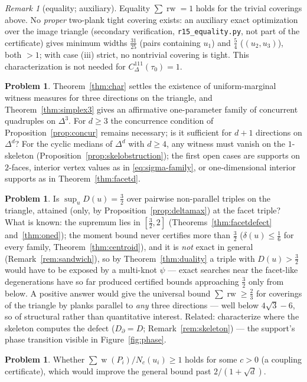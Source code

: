 \documentclass[11pt,reqno]{amsart}
\theoremstyle{plain}
\theoremstyle{definition}
\newtheorem{problem}[theorem]{Problem}
\theoremstyle{remark}
\newtheorem{remark}[theorem]{Remark}
\newcommand{\rw}{\operatorname{rw}}
\DeclareMathOperator{\wid}{w}
\begin{document}
\begin{remark}[equality; auxiliary]\label{rem:sandwicheq}
Equality $\sum\rw=1$ holds for the trivial coverings above. No \emph{proper}
two-plank tight covering exists: an auxiliary exact optimization over the image
triangle (secondary verification, \texttt{r15\_equality.py}, not part of the
certificate) gives minimum widths $\tfrac{31}{25}$ (pairs containing $u_1$) and
$\tfrac54$ ($(u_2,u_3)$), both $>1$; with case (iii) strict, no nontrivial
covering is tight. This characterization is not needed for
$C^{111}_\Delta(\tau_0)=1$.
\end{remark}

\begin{problem}\label{prob:suff}
Theorem~\ref{thm:char} settles the existence of uniform-marginal witness
measures for three directions on the triangle, and Theorem~\ref{thm:simplex3}
gives an affirmative one-parameter family of concurrent quadruples on
$\Delta^3$. For $d\ge3$ the concurrence condition of
Proposition~\ref{prop:concur} remains necessary; is it sufficient for $d+1$
directions on $\Delta^d$? For the cyclic medians of $\Delta^d$ with $d\ge4$,
any witness must vanish on the $1$-skeleton
(Proposition~\ref{prop:skelobstruction}); the first open cases are supports on
$2$-faces, interior vertex values as in \eqref{eq:sigma-family}, or
one-dimensional interior supports as in Theorem~\ref{thm:facetd}.
\end{problem}
\begin{problem}\label{prob:defect}
Is $\sup_uD(u)=\tfrac32$ over pairwise non-parallel triples on the triangle,
attained (only, by Proposition~\ref{prop:deltamax}) at the facet triple? What
is known: the supremum lies in $[\tfrac32,2]$ (Theorems~\ref{thm:facetdefect}
and~\ref{thm:oned}); the moment bound never certifies more than $\tfrac32$
($\delta(u)\le\tfrac16$ for every family, Theorem~\ref{thm:centroid}), and it
is \emph{not} exact in general (Remark~\ref{rem:sandwich}), so by
Theorem~\ref{thm:duality} a triple with $D(u)>\tfrac32$ would have to be
exposed by a multi-knot $\psi$ --- exact searches near the facet-like
degenerations have so far produced certified bounds approaching $\tfrac32$
only from below. A positive answer would give the universal bound
$\sum\rw\ge\tfrac23$ for coverings of the triangle by planks parallel to
\emph{any} three directions --- well below $4\sqrt3-6$, so of structural
rather than quantitative interest. Related: characterize where the skeleton
computes the defect ($D_\partial=D$; Remark~\ref{rem:skeleton}) --- the
support's phase transition visible in Figure~\ref{fig:phase}.
\end{problem}
\begin{problem}
Whether $\sum\wid(P_i)/N_c(u_i)\ge1$ holds for some $c>0$ (a coupling certificate),
which would improve the general bound past $2/(1+\sqrt d)$.
\end{problem}
\end{document}
